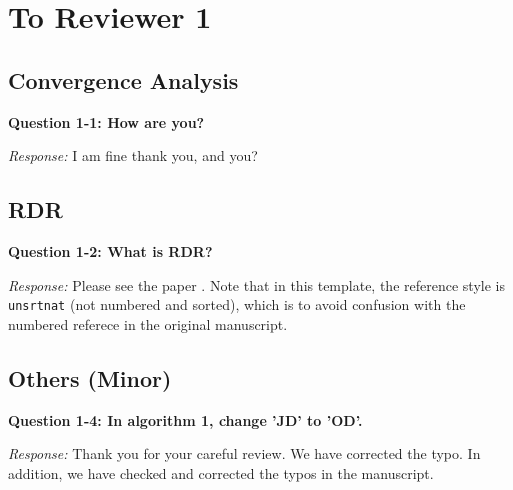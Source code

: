 \documentclass[11pt]{article}
\newcommand{\firstquestion}[2]{\noindent\textbf{Question #2: #1}}
\newcommand{\ans}[1]{\emph{\color{red} #1}}
\begin{document}
\section{To Reviewer 1}
\subsection{Convergence Analysis}\label{sec:conv}
\firstquestion{How are you?}{1-1}

\ans{Response:} I am fine thank you, and you?


\subsection{RDR}
\firstquestion{What is RDR?}{1-2}

\ans{Response:} Please see the paper \cite{lai2017RDR}.
Note that in this template, the reference style is \verb+unsrtnat+ (not numbered and sorted), 
which is to avoid confusion with the numbered referece in the original manuscript.

\subsection{Others (Minor)}
\firstquestion{In algorithm 1, change 'JD' to 'OD'.}{1-4}

\ans{Response:} Thank you for your careful review.
We have corrected the typo.
In addition, we have checked and corrected the typos in the manuscript.




\end{document}
